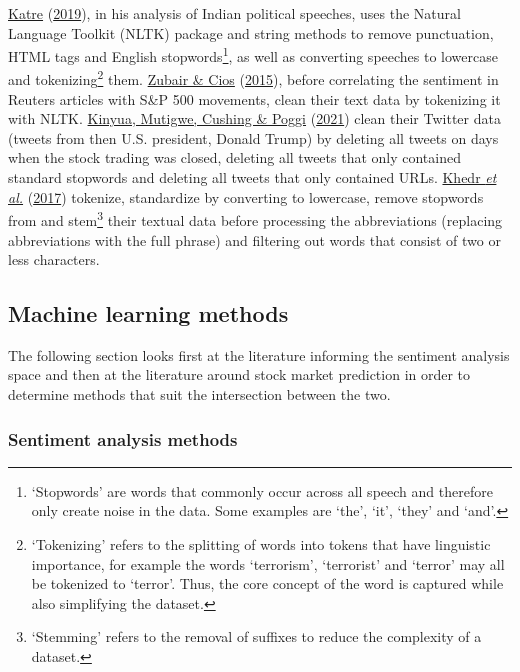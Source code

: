 \documentclass[11pt,preprint, authoryear]{elsarticle}
\numberwithin{equation}{section}
\numberwithin{figure}{section}
\numberwithin{table}{section}
\let\rmarkdownfootnote\footnote%
\def\footnote{\protect\rmarkdownfootnote}
\begin{document}
\protect\hyperlink{ref-katre2019nlp}{Katre}
(\protect\hyperlink{ref-katre2019nlp}{2019}), in his analysis of Indian
political speeches, uses the Natural Language Toolkit (NLTK) package and
string methods to remove punctuation, HTML tags and English
stopwords\footnote{`Stopwords' are words that commonly occur across all
  speech and therefore only create noise in the data. Some examples are
  `the', `it', `they' and `and'.}, as well as converting speeches to
lowercase and tokenizing\footnote{`Tokenizing' refers to the splitting
  of words into tokens that have linguistic importance, for example the
  words `terrorism', `terrorist' and `terror' may all be tokenized to
  `terror'. Thus, the core concept of the word is captured while also
  simplifying the dataset.} them.
\protect\hyperlink{ref-zubair2015extracting}{Zubair \& Cios}
(\protect\hyperlink{ref-zubair2015extracting}{2015}), before correlating
the sentiment in Reuters articles with S\&P 500 movements, clean their
text data by tokenizing it with NLTK.
\protect\hyperlink{ref-kinyua2021analysis}{Kinyua, Mutigwe, Cushing \&
Poggi} (\protect\hyperlink{ref-kinyua2021analysis}{2021}) clean their
Twitter data (tweets from then U.S. president, Donald Trump) by deleting
all tweets on days when the stock trading was closed, deleting all
tweets that only contained standard stopwords and deleting all tweets
that only contained URLs.
\protect\hyperlink{ref-khedr2017predicting}{Khedr \emph{et al.}}
(\protect\hyperlink{ref-khedr2017predicting}{2017}) tokenize,
standardize by converting to lowercase, remove stopwords from and
stem\footnote{`Stemming' refers to the removal of suffixes to reduce the
  complexity of a dataset.} their textual data before processing the
abbreviations (replacing abbreviations with the full phrase) and
filtering out words that consist of two or less characters.

\hypertarget{machine-learning-methods}{%
\subsection{\texorpdfstring{Machine learning methods
\label{ML}}{Machine learning methods }}\label{machine-learning-methods}}

The following section looks first at the literature informing the
sentiment analysis space and then at the literature around stock market
prediction in order to determine methods that suit the intersection
between the two.

\hypertarget{sentiment-analysis-methods}{%
\subsubsection{\texorpdfstring{Sentiment analysis methods
\label{sentAnal}}{Sentiment analysis methods }}\label{sentiment-analysis-methods}}
\end{document}
